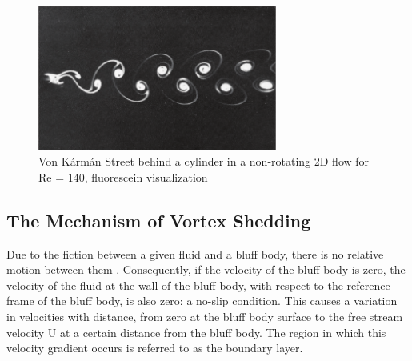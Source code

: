 \begin{figure}[htbp]
	\centering
	\includegraphics[width=0.7\textwidth]{images/vonKarmanStreet.png}
	\caption{Von Kármán Street behind a cylinder in a non-rotating 2D flow for Re = 140, fluorescein visualization \parencite[144]{ilieva2017turbulence}}
	\label{fig:vonKarmanStreet}
\end{figure}
\subsection{The Mechanism of Vortex Shedding}
Due to the fiction between a given fluid and a bluff body, there is no relative motion between them \parencite{boundaryLayerTheory_2018, jeff_defoe_bluff_2020}. Consequently, if the velocity of the bluff body is zero, the velocity of the fluid at the wall of the bluff body, with respect to the reference frame of the bluff body, is also zero: a no-slip condition. This causes a variation in velocities with distance, from zero at the bluff body surface to the free stream velocity U at a certain distance from the bluff body. The region in which this velocity gradient occurs is referred to as the boundary layer.


